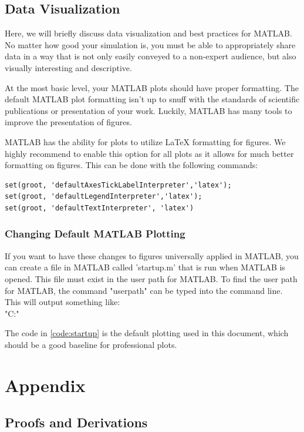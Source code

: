\documentclass[12pt]{report}
\begin{document}
{\section{Data Visualization}
Here, we will briefly discuss data visualization and best practices for MATLAB. No matter how good your simulation is, you must be able to appropriately share data in a way that is not only easily conveyed to a non-expert audience, but also visually interesting and descriptive.

At the most basic level, your MATLAB plots should have proper formatting. The default MATLAB plot formatting isn't up to snuff with the standards of scientific publications or presentation of your work. Luckily, MATLAB has many tools to improve the presentation of figures.

MATLAB has the ability for plots to utilize LaTeX formatting for figures. We highly recommend to enable this option for all plots as it allows for much better formatting on figures. This can be done with the following commands:
\begin{lstlisting}[style=Matlab-editor]
set(groot, 'defaultAxesTickLabelInterpreter','latex');
set(groot, 'defaultLegendInterpreter','latex');
set(groot, 'defaultTextInterpreter', 'latex')
\end{lstlisting}
\subsection{Changing Default MATLAB Plotting}
If you want to have these changes to figures universally applied in MATLAB, you can create a file in MATLAB called 'startup.m' that is run when MATLAB is opened. This file must exist in the user path for MATLAB. To find the user path for MATLAB, the command "userpath" can be typed into the command line. This will output something like:
\\
"C:\Users\YourName\OneDrive\Documents\MATLAB"

The code in \ref{code:startup} is the default plotting used in this document, which should be a good baseline for professional plots.
\label{code:startup}

\chapter{Appendix}

\section{Proofs and Derivations}\label{sec:ProofsAndDerivations}
}
\end{document}
